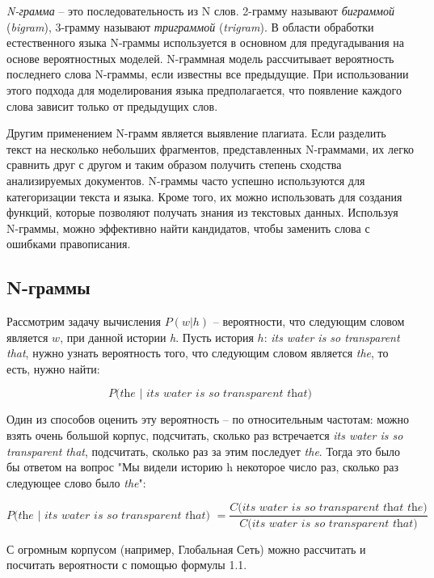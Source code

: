 \documentclass[a4paper,12pt,preview]{report} %
\begin{document}
	\textit{N-грамма} -- это последовательность из N слов. 2-грамму называют \textit{биграммой} (\textit{bigram}), 3-грамму называют \textit{триграммой} (\textit{trigram}).
	В области обработки естественного языка N-граммы используется в основном для предугадывания на основе вероятностных моделей. N-граммная модель рассчитывает вероятность последнего слова N-граммы, если известны все предыдущие. При использовании этого подхода для моделирования языка предполагается, что появление каждого слова зависит только от предыдущих слов. \cite{8}
	
	Другим применением N-грамм является выявление плагиата. Если разделить текст на несколько небольших фрагментов, представленных N-граммами, их легко сравнить друг с другом и таким образом получить степень сходства анализируемых документов\cite{9}. N-граммы часто успешно используются для категоризации текста и языка. Кроме того, их можно использовать для создания функций, которые позволяют получать знания из текстовых данных. Используя N-граммы, можно эффективно найти кандидатов, чтобы заменить слова с ошибками правописания.
	
	\subsection{N-граммы}
	Рассмотрим задачу вычисления $P(w|h)$ -- вероятности, что следующим словом является $w$, при данной истории \textit{h}. Пусть история $h$: \textit{its water is so transparent that}, нужно узнать вероятность того, что следующим словом является \textit{the}, то есть, нужно найти:
	
	\begin{equation}
		\textit{P(the | its water is so transparent that)}
	\end{equation}
	
	Один из способов оценить эту вероятность -- по относительным частотам:	можно взять очень большой корпус, подсчитать, сколько раз встречается \textit{its water is so transparent that}, подсчитать, сколько раз за этим последует \textit{the}. Тогда это было бы ответом на вопрос "Мы видели историю h некоторое число раз, сколько раз следующее слово было \textit{the}":
	
	\begin{equation}
		\textit{P(the | its water is so transparent that) } = \dfrac{\textit{C(its water is so transparent that the)}}{\textit{C(its water is so transparent that)}}
	\end{equation}
	
	С огромным корпусом (например, Глобальная Сеть) можно рассчитать и посчитать вероятности с помощью формулы 1.1.
	
\end{document}
